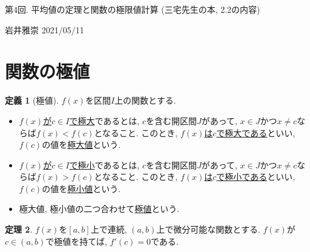 \documentclass[dvipdfmx,a4paper,11pt]{article}
\theoremstyle{definition}
\newtheorem{thm}{定理}
\newtheorem{dfn}[thm]{定義}
\begin{document}
\newpage

\begin{center}
{\Large 第4回. 平均値の定理と関数の極限値計算 (三宅先生の本, 2.2の内容)}
\end{center}

\begin{flushright}
 岩井雅崇 2021/05/11
\end{flushright}

\section{関数の極値}

\begin{tcolorbox}[
    colback = white,
    colframe = green!35!black,
    fonttitle = \bfseries,
    breakable = true]
    \begin{dfn}[極値]
$f(x)$を区間$I$上の関数とする.
\begin{itemize}
\item \underline{$f(x)$が$c\in I$で極大}であるとは, $c$を含む開区間$J$があって, $x \in J$かつ$x \neq c$ならば$f(x) < f(c)$となること.
このとき, \underline{$f(x)$は$c$で極大である}といい, $f(c)$の値を\underline{極大値}という.
\item \underline{$f(x)$が$c\in I$で極小}であるとは, $c$を含む開区間$J$があって, $x \in J$かつ$x \neq c$ならば$f(x) > f(c)$となること.
このとき, \underline{$f(x)$は$c$で極小である}といい, $f(c)$の値を\underline{極小値}という.
\item  極大値, 極小値の二つ合わせて\underline{極値}という.%
\end{itemize}

    \end{dfn}
\end{tcolorbox}

\begin{tcolorbox}[
    colback = white,
    colframe = green!35!black,
    fonttitle = \bfseries,
    breakable = true]
    \begin{thm}
    $f(x)$を$[a,b]$上で連続, $(a,b)$上で微分可能な関数とする.
    $f(x)$が$c \in (a,b)$で極値を持てば, $f'(c) = 0$である.
    \end{thm}
\end{tcolorbox}
\end{document}
